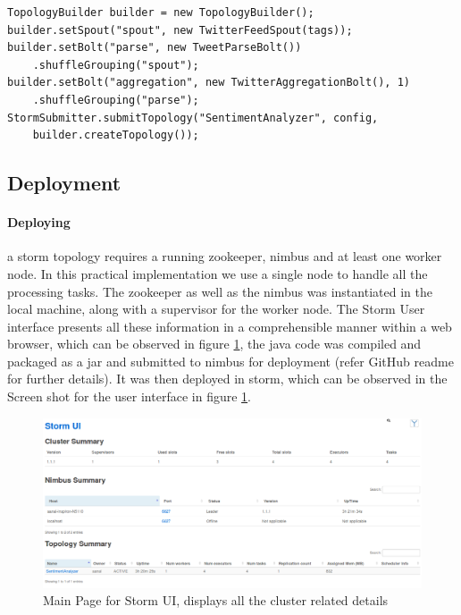 \documentclass[runningheads,a4paper]{llncs}[2015/06/24]
\begin{document}
\begin{lstlisting}[float,caption=Bare Spout Implementation,label=lst:toposetup]
TopologyBuilder builder = new TopologyBuilder();
builder.setSpout("spout", new TwitterFeedSpout(tags));
builder.setBolt("parse", new TweetParseBolt())
	.shuffleGrouping("spout");
builder.setBolt("aggregation", new TwitterAggregationBolt(), 1)
	.shuffleGrouping("parse");
StormSubmitter.submitTopology("SentimentAnalyzer", config, 
	builder.createTopology());
\end{lstlisting}

\subsection{Deployment}
\paragraph{Deploying} a storm topology requires a running zookeeper, nimbus and at least one worker node. In this practical implementation we use a single node to handle all the processing tasks. The zookeeper as well as the nimbus was instantiated in the local machine, along with a supervisor for the worker node. The Storm User interface presents all these information in a comprehensible manner within a web browser, which can be observed in figure \ref{fig:stormui}, the java code was compiled and packaged as a jar and submitted to nimbus for deployment (refer GitHub readme for further details). It was then deployed in storm, which can be observed in the Screen shot for the user interface in figure \ref{fig:stormui}.

\begin{figure}
  \begin{center}
    \includegraphics[width=\textwidth]{ui-mainpage.png}
    \caption{Main Page for Storm UI, displays all the cluster related details}
    \label{fig:stormui}
   \end{center}
\end{figure}
\end{document}
